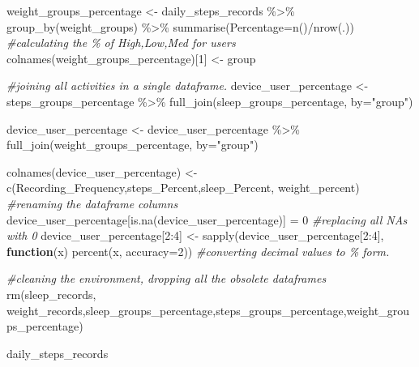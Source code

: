 \documentclass[
]{article}
\newenvironment{Shaded}{\begin{snugshade}}{\end{snugshade}}
\newcommand{\AttributeTok}[1]{\textcolor[rgb]{0.77,0.63,0.00}{#1}}
\newcommand{\CommentTok}[1]{\textcolor[rgb]{0.56,0.35,0.01}{\textit{#1}}}
\newcommand{\ControlFlowTok}[1]{\textcolor[rgb]{0.13,0.29,0.53}{\textbf{#1}}}
\newcommand{\DecValTok}[1]{\textcolor[rgb]{0.00,0.00,0.81}{#1}}
\newcommand{\FunctionTok}[1]{\textcolor[rgb]{0.00,0.00,0.00}{#1}}
\newcommand{\NormalTok}[1]{#1}
\newcommand{\OtherTok}[1]{\textcolor[rgb]{0.56,0.35,0.01}{#1}}
\newcommand{\SpecialCharTok}[1]{\textcolor[rgb]{0.00,0.00,0.00}{#1}}
\newcommand{\StringTok}[1]{\textcolor[rgb]{0.31,0.60,0.02}{#1}}
\begin{document}
\begin{Shaded}
\begin{Highlighting}[]
\NormalTok{    weight\_groups\_percentage }\OtherTok{\textless{}{-}}\NormalTok{  daily\_steps\_records }\SpecialCharTok{\%\textgreater{}\%} \FunctionTok{group\_by}\NormalTok{(weight\_groups) }\SpecialCharTok{\%\textgreater{}\%} \FunctionTok{summarise}\NormalTok{(}\AttributeTok{Percentage=}\FunctionTok{n}\NormalTok{()}\SpecialCharTok{/}\FunctionTok{nrow}\NormalTok{(.))  }\CommentTok{\#calculating the \% of High,Low,Med for users}
          \FunctionTok{colnames}\NormalTok{(weight\_groups\_percentage)[}\DecValTok{1}\NormalTok{] }\OtherTok{\textless{}{-}} \StringTok{\textquotesingle{}group\textquotesingle{}}

\CommentTok{\#joining all activities in a single dataframe.}
\NormalTok{device\_user\_percentage }\OtherTok{\textless{}{-}} 
\NormalTok{   steps\_groups\_percentage    }\SpecialCharTok{\%\textgreater{}\%} 
  \FunctionTok{full\_join}\NormalTok{(sleep\_groups\_percentage, }\AttributeTok{by=}\StringTok{"group"}\NormalTok{)}


\NormalTok{device\_user\_percentage }\OtherTok{\textless{}{-}} 
\NormalTok{  device\_user\_percentage       }\SpecialCharTok{\%\textgreater{}\%} 
  \FunctionTok{full\_join}\NormalTok{(weight\_groups\_percentage, }\AttributeTok{by=}\StringTok{"group"}\NormalTok{)}
    
\FunctionTok{colnames}\NormalTok{(device\_user\_percentage) }\OtherTok{\textless{}{-}} \FunctionTok{c}\NormalTok{(}\StringTok{\textquotesingle{}Recording\_Frequency\textquotesingle{}}\NormalTok{,}\StringTok{\textquotesingle{}steps\_Percent\textquotesingle{}}\NormalTok{,}\StringTok{\textquotesingle{}sleep\_Percent\textquotesingle{}}\NormalTok{, }\StringTok{\textquotesingle{}weight\_percent\textquotesingle{}}\NormalTok{) }\CommentTok{\#renaming the dataframe columns}
\NormalTok{device\_user\_percentage[}\FunctionTok{is.na}\NormalTok{(device\_user\_percentage)] }\OtherTok{=} \DecValTok{0} \CommentTok{\#replacing all NAs with 0}
\NormalTok{device\_user\_percentage[}\DecValTok{2}\SpecialCharTok{:}\DecValTok{4}\NormalTok{] }\OtherTok{\textless{}{-}} \FunctionTok{sapply}\NormalTok{(device\_user\_percentage[}\DecValTok{2}\SpecialCharTok{:}\DecValTok{4}\NormalTok{], }\ControlFlowTok{function}\NormalTok{(x) }\FunctionTok{percent}\NormalTok{(x, }\AttributeTok{accuracy=}\DecValTok{2}\NormalTok{)) }\CommentTok{\#converting decimal values to \% form.}


\CommentTok{\#cleaning the environment, dropping all the obsolete dataframes}
\FunctionTok{rm}\NormalTok{(sleep\_records, weight\_records,sleep\_groups\_percentage,steps\_groups\_percentage,weight\_groups\_percentage)     }


\NormalTok{daily\_steps\_records  }
\end{Highlighting}
\end{Shaded}
\end{document}
